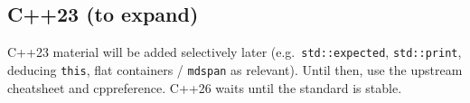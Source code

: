 \subsection{C++23 (to expand)}
\label{subsec:cpp23-planned}
C++23 material will be added selectively later (e.g.\ \texttt{std::expected},
\texttt{std::print}, deducing \texttt{this}, flat containers / \texttt{mdspan} as relevant). 
Until then, use the upstream cheatsheet and cppreference. C++26 waits until the standard is stable.

